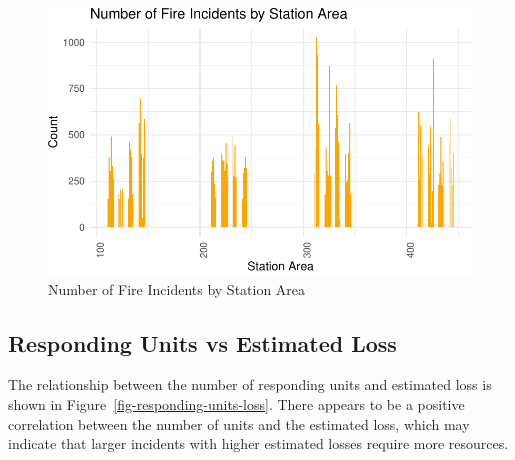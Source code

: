 \documentclass[
  letterpaper,
  DIV=11,
  numbers=noendperiod]{scrartcl}
\begin{document}
\begin{figure}[H]

{\centering \includegraphics{paper_files/figure-pdf/fig-fire-incidents-station-area-1.pdf}

}

\caption{\label{fig-fire-incidents-station-area}Number of Fire Incidents
by Station Area}

\end{figure}

\hypertarget{responding-units-vs-estimated-loss}{%
\subsection{Responding Units vs Estimated
Loss}\label{responding-units-vs-estimated-loss}}

The relationship between the number of responding units and estimated
loss is shown in Figure~\ref{fig-responding-units-loss}. There appears
to be a positive correlation between the number of units and the
estimated loss, which may indicate that larger incidents with higher
estimated losses require more resources.
\end{document}
